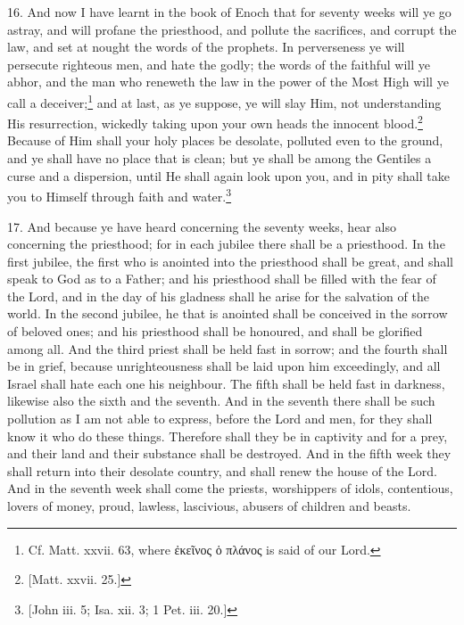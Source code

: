 16. And now I have learnt in the book of Enoch that for seventy weeks will ye go astray, and will profane the priesthood, and pollute the sacrifices, and corrupt the law, and set at nought the words of the prophets. In perverseness ye will persecute righteous men, and hate the godly; the words of the faithful will ye abhor, and the man who reneweth the law in the power of the Most High will ye call a deceiver;\footnote{Cf. Matt. xxvii. 63, where \textgreek{ἐκεῖνος ὁ πλάνος} is said of our Lord.} and at last, as ye suppose, ye will slay Him, not understanding His resurrection, wickedly taking upon your own heads the innocent blood.\footnote{[Matt. xxvii. 25.]} Because of Him shall your holy places be desolate, polluted even to the ground, and ye shall have no place that is clean; but ye shall be among the Gentiles a curse and a dispersion, until He shall again look upon you, and in pity shall take you to Himself through faith and water.\footnote{[John iii. 5; Isa. xii. 3; 1 Pet. iii. 20.]}

17. And because ye have heard concerning the seventy weeks, hear also concerning the priesthood; for in each jubilee there shall be a priesthood. In the first jubilee, the first who is anointed into the priesthood shall be great, and shall speak to God as to a Father; and his priesthood shall be filled with the fear of the Lord, and in the day of his gladness shall he arise for the salvation of the world. In the second jubilee, he that is anointed shall be conceived in the sorrow of beloved ones; and his priesthood shall be honoured, and shall be glorified among all. And the third priest shall be held fast in sorrow; and the fourth shall be in grief, because unrighteousness shall be laid upon him exceedingly, and all Israel shall hate each one his neighbour. The fifth shall be held fast in darkness, likewise also the sixth and the seventh. And in the seventh there shall be such pollution as I am not able to express, before the Lord and men, for they shall know it who do these things. Therefore shall they be in captivity and for a prey, and their land and their substance shall be destroyed. And in the fifth week they shall return into their desolate country, and shall renew the house of the Lord. And in the seventh week shall come the priests, worshippers of idols, contentious, lovers of money, proud, lawless, lascivious, abusers of children and beasts.

